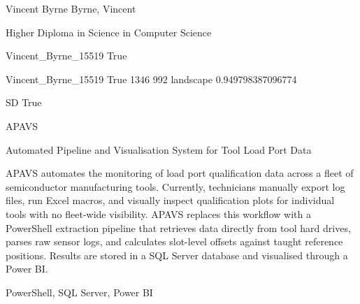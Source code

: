 \documentclass[twoside]{report}
\begin{document}
\begingroup{}\relax



\def\Key{Vincent_Byrne_15519}

{Vincent Byrne}
{Byrne, Vincent}

{Higher Diploma in Science in Computer Science}

{Vincent_Byrne_15519}
{True}

{Vincent_Byrne_15519}
{True}
{1346}
{992}
{landscape}
{0.949798387096774}

{SD}
{True}

{APAVS}

{Automated Pipeline and Visualisation System for Tool Load Port Data}

{APAVS automates the monitoring of load port qualification data across a fleet of semiconductor manufacturing tools. Currently, technicians manually export log files, run Excel macros, and visually inspect qualification plots for individual tools with no fleet-wide visibility. APAVS replaces this workflow with a PowerShell extraction pipeline that retrieves data directly from tool hard drives, parses raw sensor logs, and calculates slot-level offsets against taught reference positions. Results are stored in a SQL Server database and visualised through a Power BI.}

{PowerShell, SQL Server, Power BI}
\end{document}
